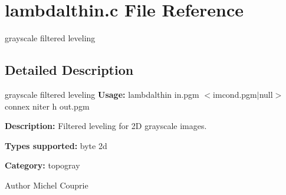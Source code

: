 \section{lambdalthin.c File Reference}
\label{lambdalthin_8c}


grayscale filtered leveling  




\subsection{Detailed Description}
grayscale filtered leveling {\bfseries Usage:} lambdalthin in.pgm $<$imcond.pgm$|$null$>$ connex niter h out.pgm

{\bfseries Description:} Filtered leveling for 2D grayscale images.

{\bfseries Types supported:} byte 2d

{\bfseries Category:} topogray

\begin{DoxyAuthor}{Author}
Michel Couprie 
\end{DoxyAuthor}

